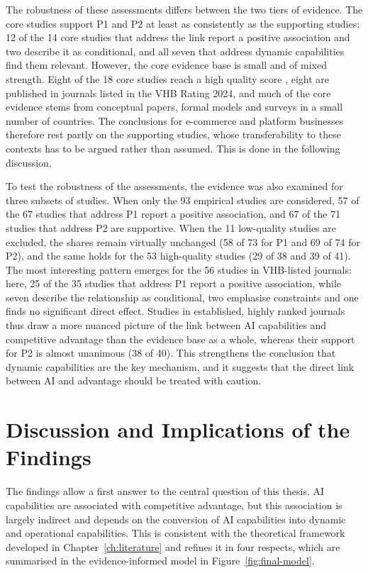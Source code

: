 The robustness of these assessments differs between the two tiers of evidence. The core studies support P1 and P2 at least as consistently as the supporting studies: 12 of the 14 core studies that address the link report a positive association and two describe it as conditional, and all seven that address dynamic capabilities find them relevant. However, the core evidence base is small and of mixed strength. Eight of the 18 core studies reach a high quality score , eight are published in journals listed in the VHB Rating 2024, and much of the core evidence stems from conceptual papers, formal models and surveys in a small number of countries. The conclusions for e-commerce and platform businesses therefore rest partly on the supporting studies, whose transferability to these contexts has to be argued rather than assumed. This is done in the following discussion.

To test the robustness of the assessments, the evidence was also examined for three subsets of studies. When only the 93 empirical studies are considered, 57 of the 67 studies that address P1 report a positive association, and 67 of the 71 studies that address P2 are supportive. When the 11 low-quality studies are excluded, the shares remain virtually unchanged (58 of 73 for P1 and 69 of 74 for P2), and the same holds for the 53 high-quality studies (29 of 38 and 39 of 41). The most interesting pattern emerges for the 56 studies in VHB-listed journals: here, 25 of the 35 studies that address P1 report a positive association, while seven describe the relationship as conditional, two emphasise constraints and one finds no significant direct effect. Studies in established, highly ranked journals thus draw a more nuanced picture of the link between AI capabilities and competitive advantage than the evidence base as a whole, whereas their support for P2 is almost unanimous (38 of 40). This strengthens the conclusion that dynamic capabilities are the key mechanism, and it suggests that the direct link between AI and advantage should be treated with caution.

\section{Discussion and Implications of the Findings}
\label{sec:discussion}

The findings allow a first answer to the central question of this thesis. AI capabilities are associated with competitive advantage, but this association is largely indirect and depends on the conversion of AI capabilities into dynamic and operational capabilities. This is consistent with the theoretical framework developed in Chapter~\ref{ch:literature} and refines it in four respects, which are summarised in the evidence-informed model in Figure~\ref{fig:final-model}.

